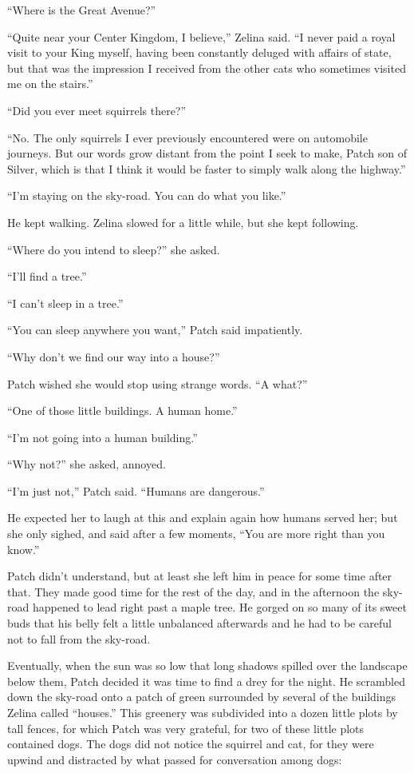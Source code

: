 \documentclass[ebook,oneside,openany,12pt]{memoir}
\begin{document}
“Where is the Great Avenue?”

“Quite near your Center Kingdom, I believe,” Zelina said. “I never
paid a royal visit to your King myself, having been constantly deluged
with affairs of state, but that was the impression I received from the
other cats who sometimes visited me on the stairs.”

“Did you ever meet squirrels there?”

“No. The only squirrels I ever previously encountered were on
automobile journeys. But our words grow distant from the point I seek
to make, Patch son of Silver, which is that I think it would be faster
to simply walk along the highway.”

“I’m staying on the sky-road. You can do what you like.”

He kept walking. Zelina slowed for a little while, but she kept
following.

“Where do you intend to sleep?” she asked.

“I’ll find a tree.”

“I can’t sleep in a tree.”

“You can sleep anywhere you want,” Patch said impatiently.

“Why don’t we find our way into a house?”

Patch wished she would stop using strange words. “A what?”

“One of those little buildings. A human home.”

“I’m not going into a human building.”

“Why not?” she asked, annoyed.

“I’m just not,” Patch said. “Humans are dangerous.”

He expected her to laugh at this and explain again how humans served
her; but she only sighed, and said after a few moments, “You are more
right than you know.”

Patch didn’t understand, but at least she left him in peace for some
time after that. They made good time for the rest of the day, and in
the afternoon the sky-road happened to lead right past a maple
tree. He gorged on so many of its sweet buds that his belly felt a
little unbalanced afterwards and he had to be careful not to fall from
the sky-road.

Eventually, when the sun was so low that long shadows spilled over the
landscape below them, Patch decided it was time to find a drey for the
night. He scrambled down the sky-road onto a patch of green surrounded
by several of the buildings Zelina called “houses.” This greenery was
subdivided into a dozen little plots by tall fences, for which Patch
was very grateful, for two of these little plots contained dogs. The
dogs did not notice the squirrel and cat, for they were upwind and
distracted by what passed for conversation among dogs:
\end{document}
